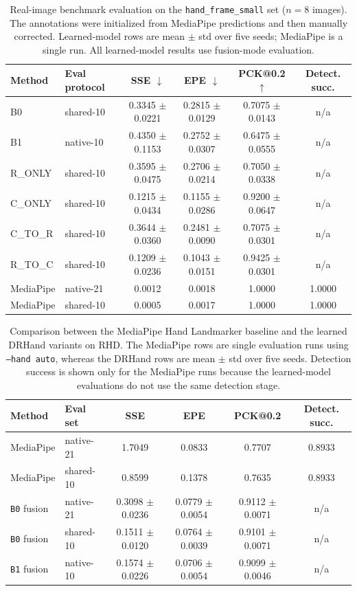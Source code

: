 \documentclass[10pt,letterpaper]{article}
\begin{document}
\begin{table}[H]
\centering
\footnotesize
\caption{Real-image benchmark evaluation on the \texttt{hand\_frame\_small} set ($n=8$ images). The annotations were initialized from MediaPipe predictions and then manually corrected. Learned-model rows are mean $\pm$ std over five seeds; MediaPipe is a single run. All learned-model results use fusion-mode evaluation.}
\label{tab:hand_frame_small_pilot}
\begin{tabular}{llcccc}
\toprule
Method & Eval protocol & SSE $\downarrow$ & EPE $\downarrow$ & PCK@0.2 $\uparrow$ & Detect. succ. \\
\midrule
B0 & shared-10 & 0.3345 $\pm$ 0.0221 & 0.2815 $\pm$ 0.0129 & 0.7075 $\pm$ 0.0143 & n/a \\
B1 & native-10 & 0.4350 $\pm$ 0.1153 & 0.2752 $\pm$ 0.0307 & 0.6475 $\pm$ 0.0555 & n/a \\
R\_ONLY & shared-10 & 0.3595 $\pm$ 0.0475 & 0.2706 $\pm$ 0.0214 & 0.7050 $\pm$ 0.0338 & n/a \\
C\_ONLY & shared-10 & 0.1215 $\pm$ 0.0434 & 0.1155 $\pm$ 0.0286 & 0.9200 $\pm$ 0.0647 & n/a \\
C\_TO\_R & shared-10 & 0.3644 $\pm$ 0.0360 & 0.2481 $\pm$ 0.0090 & 0.7075 $\pm$ 0.0301 & n/a \\
R\_TO\_C & shared-10 & 0.1209 $\pm$ 0.0236 & 0.1043 $\pm$ 0.0151 & 0.9425 $\pm$ 0.0301 & n/a \\
MediaPipe & native-21 & 0.0012 & 0.0018 & 1.0000 & 1.0000 \\
MediaPipe & shared-10 & 0.0005 & 0.0017 & 1.0000 & 1.0000 \\
\bottomrule
\end{tabular}
\end{table}

\begin{table}[H]
\centering
\footnotesize
\caption{Comparison between the MediaPipe Hand Landmarker baseline and the learned DRHand variants on RHD. The MediaPipe rows are single evaluation runs using \texttt{--hand auto}, whereas the DRHand rows are mean $\pm$ std over five seeds. Detection success is shown only for the MediaPipe runs because the learned-model evaluations do not use the same detection stage.}
\label{tab:mediapipe_baseline}
\begin{tabular}{llcccc}
\toprule
Method & Eval set & SSE & EPE & PCK@0.2 & Detect. succ. \\
\midrule
MediaPipe & native-21 & 1.7049 & 0.0833 & 0.7707 & 0.8933 \\
MediaPipe & shared-10 & 0.8599 & 0.1378 & 0.7635 & 0.8933 \\
\texttt{B0} fusion & native-21 & 0.3098 $\pm$ 0.0236 & 0.0779 $\pm$ 0.0054 & 0.9112 $\pm$ 0.0071 & n/a \\
\texttt{B0} fusion & shared-10 & 0.1511 $\pm$ 0.0120 & 0.0764 $\pm$ 0.0039 & 0.9101 $\pm$ 0.0071 & n/a \\
\texttt{B1} fusion & native-10 & 0.1574 $\pm$ 0.0226 & 0.0706 $\pm$ 0.0054 & 0.9099 $\pm$ 0.0046 & n/a \\
\bottomrule
\end{tabular}
\end{table}
\end{document}
